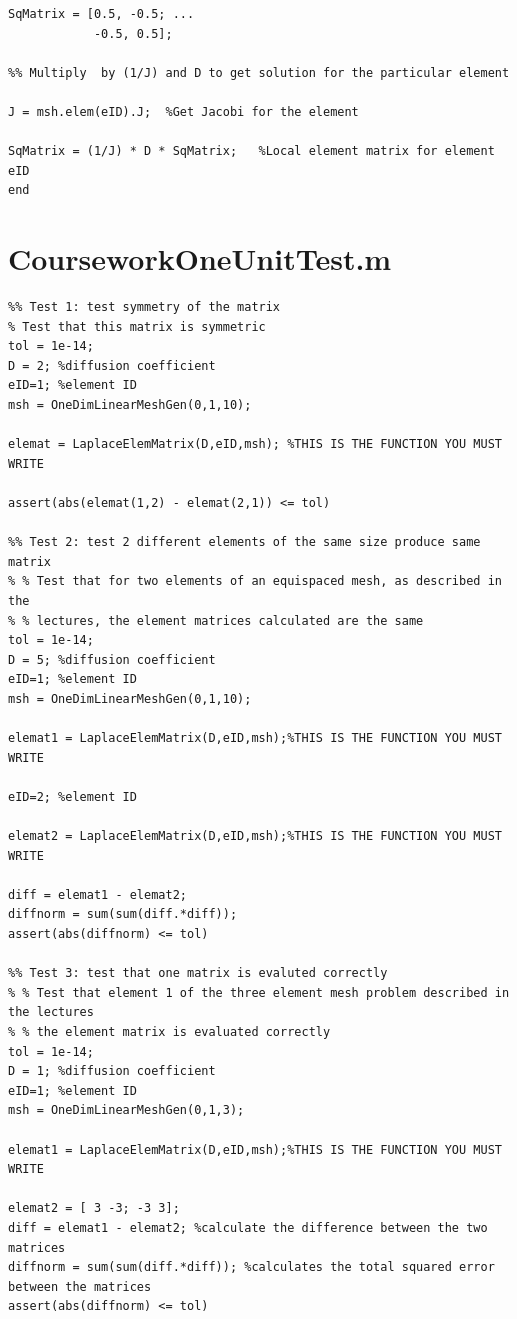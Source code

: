 \documentclass[11pt]{article}
\begin{document}
\begin{appendices}
\begin{lstlisting}
SqMatrix = [0.5, -0.5; ...
            -0.5, 0.5];

%% Multiply  by (1/J) and D to get solution for the particular element

J = msh.elem(eID).J;  %Get Jacobi for the element

SqMatrix = (1/J) * D * SqMatrix;   %Local element matrix for element eID
end
\end{lstlisting}
\pagebreak

\section{CourseworkOneUnitTest.m}
\label{ap:CW1}
\begin{lstlisting}
%% Test 1: test symmetry of the matrix
% Test that this matrix is symmetric
tol = 1e-14;
D = 2; %diffusion coefficient
eID=1; %element ID
msh = OneDimLinearMeshGen(0,1,10);

elemat = LaplaceElemMatrix(D,eID,msh); %THIS IS THE FUNCTION YOU MUST WRITE

assert(abs(elemat(1,2) - elemat(2,1)) <= tol)

%% Test 2: test 2 different elements of the same size produce same matrix
% % Test that for two elements of an equispaced mesh, as described in the
% % lectures, the element matrices calculated are the same
tol = 1e-14;
D = 5; %diffusion coefficient
eID=1; %element ID
msh = OneDimLinearMeshGen(0,1,10);

elemat1 = LaplaceElemMatrix(D,eID,msh);%THIS IS THE FUNCTION YOU MUST WRITE

eID=2; %element ID

elemat2 = LaplaceElemMatrix(D,eID,msh);%THIS IS THE FUNCTION YOU MUST WRITE

diff = elemat1 - elemat2;
diffnorm = sum(sum(diff.*diff));
assert(abs(diffnorm) <= tol)

%% Test 3: test that one matrix is evaluted correctly
% % Test that element 1 of the three element mesh problem described in the lectures
% % the element matrix is evaluated correctly
tol = 1e-14;
D = 1; %diffusion coefficient
eID=1; %element ID
msh = OneDimLinearMeshGen(0,1,3);

elemat1 = LaplaceElemMatrix(D,eID,msh);%THIS IS THE FUNCTION YOU MUST WRITE

elemat2 = [ 3 -3; -3 3];
diff = elemat1 - elemat2; %calculate the difference between the two matrices
diffnorm = sum(sum(diff.*diff)); %calculates the total squared error between the matrices
assert(abs(diffnorm) <= tol)
\end{lstlisting}
\pagebreak



\end{appendices}
\end{document}
